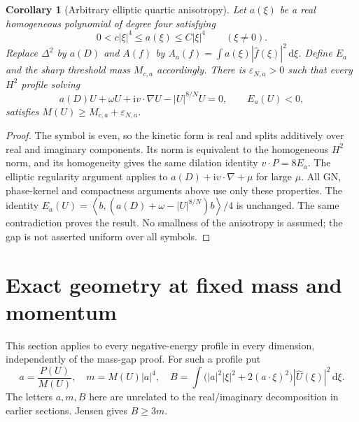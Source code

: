 \documentclass[11pt,a4paper]{article}
\newtheorem{corollary}[theorem]{Corollary}
\theoremstyle{remark}\newtheorem{remark}[theorem]{Remark}
\newcommand{\ii}{\mathrm i}\newcommand{\dd}{\,\mathrm d}
\newcommand{\ip}[2]{\left\langle #1,#2\right\rangle}
\begin{document}
\begin{corollary}[Arbitrary elliptic quartic anisotropy]
Let $a(\xi)$ be a real homogeneous polynomial of degree four satisfying
\[
 0<c|\xi|^4\le a(\xi)\le C|\xi|^4\qquad(\xi\ne0).
\]
Replace $\Delta^2$ by $a(D)$ and $A(f)$ by $A_a(f)=\int a(\xi)|\widehat f(\xi)|^2\dd\xi$. Define $E_a$ and the sharp threshold mass $M_{c,a}$ accordingly. There is $\varepsilon_{N,a}>0$ such that every $H^2$ profile solving
\[
 a(D)U+\omega U+\ii v\cdot\nabla U-|U|^{8/N}U=0,
 \qquad E_a(U)<0,
\]
satisfies $M(U)\ge M_{c,a}+\varepsilon_{N,a}$.
\end{corollary}
\begin{proof}
The symbol is even, so the kinetic form is real and splits additively over real and imaginary components. Its norm is equivalent to the homogeneous $H^2$ norm, and its homogeneity gives the same dilation identity $v\cdot P=8E_a$. The elliptic regularity argument applies to $a(D)+\ii v\cdot\nabla+\mu$ for large $\mu$. All GN, phase-kernel and compactness arguments above use only these properties. The identity $E_a(U)=\ip b{(a(D)+\omega-|U|^{8/N})b}/4$ is unchanged. The same contradiction proves the result. No smallness of the anisotropy is assumed; the gap is not asserted uniform over all symbols.
\end{proof}

\section{Exact geometry at fixed mass and momentum}
This section applies to every negative-energy profile in every dimension, independently of the mass-gap proof. For such a profile put
\[
 a=\frac{P(U)}{M(U)},\quad m=M(U)|a|^4,\quad
 B=\int\bigl(|a|^2|\xi|^2+2(a\cdot\xi)^2\bigr)|\widehat U(\xi)|^2\dd\xi.
\]
The letters $a,m,B$ here are unrelated to the real/imaginary decomposition in earlier sections. Jensen gives $B\ge3m$.
\end{document}
